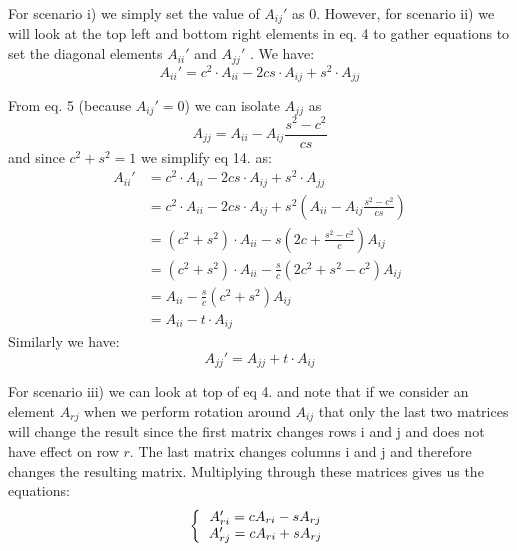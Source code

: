 \documentclass[12pt,twoside]{article}
\begin{document}
For scenario i) we simply set the value of $A_{ij}'$ as 0. However, for scenario ii) we will look at the top left and bottom right elements in eq. 4 to gather equations to set the diagonal elements $A_{ii}'$ and $A_{jj}'$ . We have:
\begin{equation}
A_{ii}' = c^2 \cdot A_{ii} - 2cs\cdot A_{ij} + s^2\cdot A_{jj}
\end{equation}

From eq. 5 (because $A_{ij}'=0$) we can isolate $A_{jj}$ as\\
\begin{equation}
A_{jj} = A_{ii} - A_{ij}\frac{s^2-c^2}{cs}
\end{equation}
and since $c^2+s^2=1$ we simplify eq 14. as:
\begin{equation}
\begin{split}
A_{ii}' &= c^2 \cdot A_{ii} - 2cs\cdot A_{ij} + s^2\cdot A_{jj}\\
& = c^2 \cdot A_{ii} - 2cs\cdot A_{ij} + s^2 \left(A_{ii} - A_{ij}\frac{s^2-c^2}{cs}     \right)\\
& = (c^2 + s^2) \cdot A_{ii} - s\left(2c +  \frac{s^2-c^2}{c}      \right)A_{ij}\\
&= (c^2 + s^2) \cdot A_{ii} - \frac{s}{c}\left(2c^2 +  s^2-c^2      \right)A_{ij}\\
& = A_{ii} - \frac{s}{c}\left(c^2 +  s^2      \right)A_{ij}\\
& = A_{ii} - t\cdot A_{ij} 
\end{split}
\end{equation}
Similarly we have:\\
\begin{equation}
A_{jj}' = A_{jj} + t\cdot A_{ij}
\end{equation}



For scenario iii) we can look at top of eq 4. and note that if we consider an element $A_{rj}$ when we perform rotation around $A_{ij}$ that only the last two matrices will change the result since the first matrix changes rows i and j and does not have effect on row $r$. The last matrix changes columns i and j and therefore changes the resulting matrix. Multiplying through these matrices gives us the equations:
\begin{equation}
\bigg\{
  \begin{tabular}{cc}
$A_{ri}' = cA_{ri} - sA_{rj}$\\
$A_{rj}' = cA_{ri} + sA_{rj}$\\
  \end{tabular}
\end{equation}\\
\end{document}
